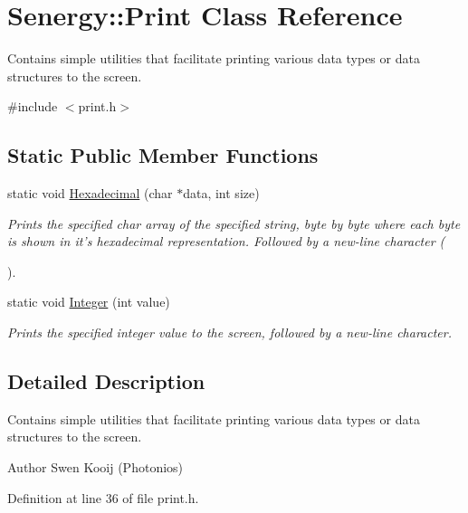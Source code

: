 \hypertarget{class_senergy_1_1_print}{\section{Senergy\-:\-:Print Class Reference}
\label{class_senergy_1_1_print}
}


Contains simple utilities that facilitate printing various data types or data structures to the screen.  




{\ttfamily \#include $<$print.\-h$>$}

\subsection*{Static Public Member Functions}
\begin{DoxyCompactItemize}
\item 
static void \hyperlink{class_senergy_1_1_print_a6c6b70bd91e56896058004bf82201010}{Hexadecimal} (char $\ast$data, int size)
\begin{DoxyCompactList}\small\item\em Prints the specified char array of the specified string, byte by byte where each byte is shown in it's hexadecimal representation. Followed by a new-\/line character (\par
). \end{DoxyCompactList}\item 
static void \hyperlink{class_senergy_1_1_print_a7899dd50cdb0b0a6e7ed144d62ea227d}{Integer} (int value)
\begin{DoxyCompactList}\small\item\em Prints the specified integer value to the screen, followed by a new-\/line character. \end{DoxyCompactList}\end{DoxyCompactItemize}


\subsection{Detailed Description}
Contains simple utilities that facilitate printing various data types or data structures to the screen. 

\begin{DoxyAuthor}{Author}
Swen Kooij (Photonios) 
\end{DoxyAuthor}


Definition at line 36 of file print.\-h.




